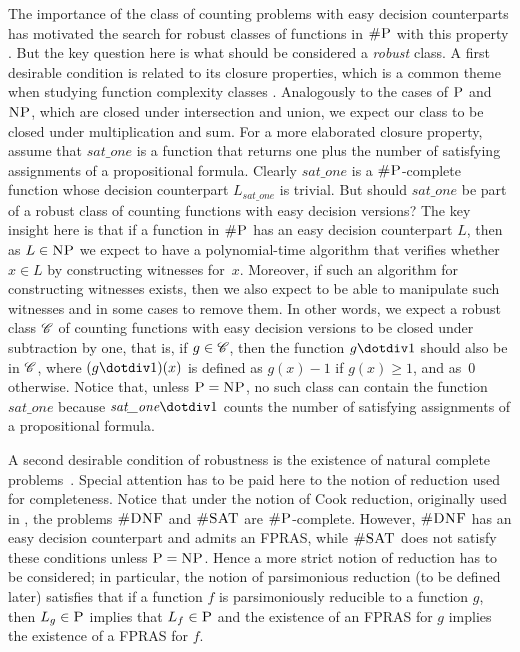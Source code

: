 The importance of the class of counting problems with easy decision counterparts has motivated the search for robust classes of functions in $\text{\sc \#P}$ with this property \cite{PagourtzisZ06}. But the key question here is what should be considered a {\em robust} class. 
A first desirable condition is related to its closure properties, which is a common theme when studying function complexity classes \cite{OH93,FH08}. Analogously to the cases of $\text{\sc P}$ and $\text{\sc NP}$, which are closed under intersection and union, we expect our class to be closed under multiplication and sum. For a more elaborated closure property, assume that $\textit{sat\_one}$ is a function that returns one plus the number of satisfying assignments of a propositional formula. Clearly $\textit{sat\_one}$ is a $\text{\sc \#P}$-complete function whose decision counterpart $L_{\textit{sat\_one}}$ is trivial. But should $\textit{sat\_one}$ be part of a robust class of counting functions with easy decision versions? The key insight here is that if a function in $\text{\sc \#P}$ has an easy decision counterpart $L$, then as $L \in \text{\sc NP}$ we expect  to have a polynomial-time algorithm that verifies whether $x \in L$ by constructing witnesses for~$x$. 
Moreover, if such an algorithm for constructing witnesses exists, then we also expect to be able to manipulate such witnesses and in some cases to remove them. In other words, we expect a robust class $\mathscr{C}$ of counting functions with easy decision versions to be closed under subtraction by one, that is, if $g \in \mathscr{C}$, then the function $g \dotdiv 1$ should also be in $\mathscr{C}$, where $(g \dotdiv 1)(x)$ is defined as $g(x) - 1$ if $g(x) \geq 1$, and as~$0$ otherwise. Notice that, unless $\text{\sc P} = \text{\sc NP}$, no such class can contain the function $\textit{sat\_one}$ because $\textit{sat\_one} \dotdiv 1$ counts the number of satisfying assignments of a propositional formula.

A second desirable condition of robustness is the existence of natural complete problems~\cite{P94}. Special attention has to be paid here to the notion of reduction used for completeness. Notice that under the notion of Cook reduction, originally used in \cite{Valiant79}, the problems $\textsc{\#DNF}$ and $\textsc{\#SAT}$ are $\text{\sc \#P}$-complete. However, $\textsc{\#DNF}$ has an easy decision counterpart and admits an FPRAS, while $\textsc{\#SAT}$ does not satisfy these conditions unless $\text{\sc P} = \text{\sc NP}$. Hence a more strict notion of reduction has to be considered; in particular, the notion of parsimonious reduction (to be defined later) satisfies that if a function $f$ is parsimoniously reducible to a function $g$, then $L_g \in \text{\sc P}$ implies that $L_f \in \text{\sc P}$ and the existence of an FPRAS for $g$ implies the existence of a FPRAS for $f$. 

